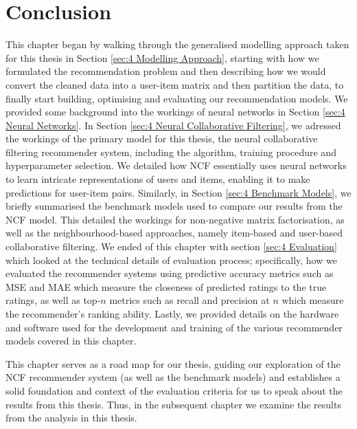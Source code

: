 \section{Conclusion}
\label{sec:4 Conclusion for Methodology}


This chapter began by walking through the generalised modelling approach taken for this thesis in Section \ref{sec:4 Modelling Approach}, starting with how we formulated the recommendation problem and then describing how we would convert the cleaned data into a user-item matrix and then partition the data, to finally start building, optimising and evaluating our recommendation models. We provided some background into the workings of neural networks in Section \ref{sec:4 Neural Networks}. In Section \ref{sec:4 Neural Collaborative Filtering}, we adressed the workings of the primary model for this thesis, the neural collaborative filtering recommender system, including the algorithm, training procedure and hyperparameter selection. We detailed how NCF essentially uses neural networks to learn intricate representations of users and items, enabling it to make predictions for user-item pairs. Similarly, in Section \ref{sec:4 Benchmark Models}, we briefly summarised the benchmark models used to compare our results from the NCF model. This detailed the workings for non-negative matrix factorisation, as well as the neighbourhood-based approaches, namely item-based and user-based collaborative filtering. We ended of this chapter with section \ref{sec:4 Evaluation} which looked at the technical details of evaluation process; specifically, how we evaluated the recommender systems using predictive accuracy metrics such as MSE and MAE which measure the closeness of predicted ratings to the true ratings, as well as top-$n$ metrics such as recall and precision at $n$ which measure the recommender's ranking ability. Lastly, we provided details on the hardware and software used for the development and training of the various recommender models covered in this chapter.

This chapter serves as a road map for our thesis, guiding our exploration of the NCF recommender system (as well as the benchmark models) and establishes a solid foundation and context of the evaluation criteria for us to speak about the results from this thesis. Thus, in the subsequent chapter we examine the results from the analysis in this thesis. 



